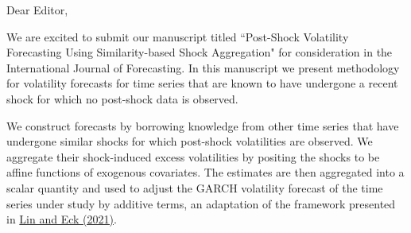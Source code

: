 \documentclass[11pt]{article}
\begin{document}
\footnotesize

\normalsize 


Dear Editor,

We are excited to submit our manuscript titled ``Post-Shock Volatility Forecasting Using Similarity-based Shock Aggregation" for consideration in the International Journal of Forecasting. %
In this manuscript we present methodology for volatility forecasts for time series that are known to have undergone a recent shock for which no post-shock data is observed. 

We construct forecasts by borrowing knowledge from other time series that have undergone similar shocks for which post-shock volatilities are observed. We aggregate their shock-induced excess volatilities by positing the shocks to be affine functions of exogenous covariates. The estimates are then aggregated into a scalar quantity and used to adjust the GARCH volatility forecast of the time series under study by additive terms, an adaptation of the framework presented in \href{https://doi.org/10.1016/j.ijforecast.2021.03.010}{Lin and Eck (2021)}.
\end{document}
